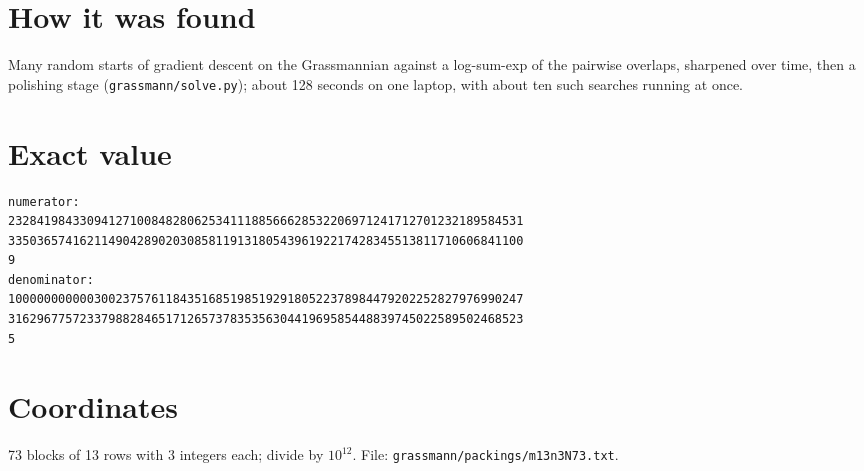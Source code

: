 \documentclass[11pt,a4paper]{article}
\begin{document}
\section{How it was found}
Many random starts of gradient descent on the Grassmannian against a log-sum-exp of the pairwise overlaps, sharpened over time, then a polishing stage (\texttt{grassmann/solve.py}); about 128 seconds on one laptop, with about ten such searches running at once.


\appendix
\section{Exact value}
{\small
\begin{verbatim}
numerator:
232841984330941271008482806253411188566628532206971241712701232189584531
335036574162114904289020308581191318054396192217428345513811710606841100
9
denominator:
100000000000300237576118435168519851929180522378984479202252827976990247
316296775723379882846517126573783535630441969585448839745022589502468523
5
\end{verbatim}}

\section{Coordinates}
73 blocks of 13 rows with 3 integers each; divide by $10^{12}$. File: \texttt{grassmann/packings/m13n3N73.txt}.
{\tiny
\begin{multicols}{3}
\end{multicols}}
\end{document}
